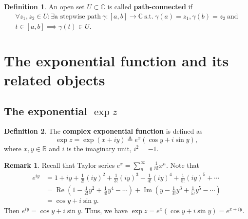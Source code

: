 \documentclass[12pt,openany]{book}
\theoremstyle{definition}
\newtheorem{definition}{Definition}
\newtheorem*{remark}{Remark}
\newcommand{\R}{\mathbb{R}}
\newcommand{\C}{\mathbb{C}}
\newcommand{\of}[1]{\left( #1 \right)}
\renewcommand{\Re}{\operatorname{Re}}
\renewcommand{\Im}{\operatorname{Im}}
\begin{document}
	\begin{tcolorbox}[title=Path-connected;]
		\begin{definition}
			An open set $U\subset\C$ is called \textbf{path-connected} if \begin{align*}
			\forall z_1,z_2\in U:\exists\text{a stepwise path}\ \gamma:[a,b]\to\C\ \text{s.t.}\ \gamma(a)=z_1,\gamma(b)=z_2\ \text{and}\\
			t\in[a,b]\implies\gamma(t)\in U.
			\end{align*}
		\end{definition}
	\end{tcolorbox}
	
	\newpage
	\section{The exponential function and its related objects}
	
	\subsection{The exponential $\exp z$}
	\begin{tcolorbox}[colback=white,colframe=defcolor,arc=5pt,title={\color{white}\bf Complex Exponential}]
		\begin{definition}
			The \textbf{complex exponential function} is defined as
			\begin{equation*}
			\exp{z} =\exp{(x+iy)} \triangleq e^{x}(\cos y + i\sin y),
			\end{equation*}
			where $x,y\in\R$ and $i$ is the imaginary unit, $i^2=-1$.
		\end{definition}
	\end{tcolorbox}
	\begin{remark}
		Recall that Taylor series $e^x=\sum_{n=0}^\infty\frac{1}{n!}x^n$. Note that \begin{align*}
		e^{iy}&=1+iy+\frac{1}{2!}(iy)^2+\frac{1}{3!}(iy)^3+\frac{1}{4!}(iy)^4+\frac{1}{5!}(iy)^5+\cdots\\
		&=\Re\of{1-\frac{1}{2!}y^2+\frac{1}{4!}y^4-\cdots}+\Im\of{y-\frac{1}{3!}y^3+\frac{1}{5!}y^5-\cdots}\\
		&=\cos y+i\sin y.
		\end{align*} Then $e^{iy}=\cos y+i\sin y$. Thus, we have $
		\exp z=e^x(\cos y+i\sin y)=e^{x+iy}.
		$
	\end{remark}
	
\end{document}
